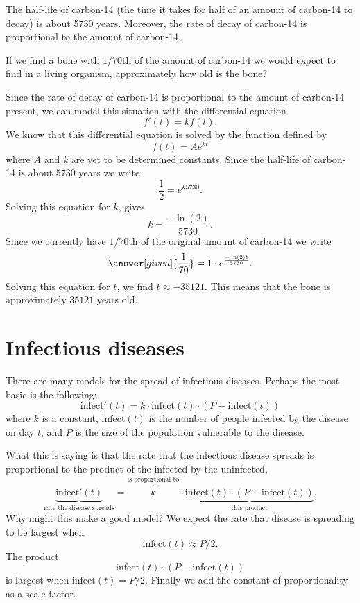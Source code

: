 \documentclass{ximera}
\begin{document}
\begin{example}
The half-life of carbon-14 (the time it takes for half of an amount of
carbon-14 to decay) is about 5730 years. Moreover, the rate of decay
of carbon-14 is proportional to the amount of carbon-14.

If we find a bone with $1/70$th of the amount of carbon-14 we would
expect to find in a living organism, approximately how old is the
bone?

\begin{explanation}
Since the rate of decay of carbon-14 is proportional to the amount of
carbon-14 present, we can model this situation with the differential
equation
\[
f'(t) = k f(t).
\]
We know that this differential equation is solved by the function
defined by
\[
f(t) = A e^{kt}
\]
where $A$ and $k$ are yet to be determined constants. Since the
half-life of carbon-14 is about $5730$ years we write
\[
\frac{1}{2} = e^{k 5730}.
\]
Solving this equation for $k$, gives
\[
k = \frac{-\ln(2)}{5730}.
\]
Since we currently have $1/70$th of the original amount of carbon-14
we write
\[
\answer[given]{\frac{1}{70}} = 1\cdot e^{\frac{-\ln(2)t}{5730}}.
\]
Solving this equation for $t$, we find $t \approx -35121$. This means
that the bone is approximately $35121$ years old.
\end{explanation}
\end{example}




\section{Infectious diseases}

There are many models for the spread of infectious diseases. Perhaps
the most basic is the following:
\[
\mathrm{infect}'(t) = k\cdot \mathrm{infect}(t)\cdot(P-\mathrm{infect}(t))
\]
where $k$ is a constant, $\mathrm{infect}(t)$ is the number of people
infected by the disease on day $t$, and $P$ is the size of the
population vulnerable to the disease.

What this is saying is that the rate that the infectious disease
spreads is proportional to the product of the infected by the
uninfected,
\[
\underbrace{\mathrm{infect}'(t)}_{\text{rate the disease
spreads}} = \overbrace{k}^{\text{is proportional to}} \cdot \underbrace{\mathrm{infect}(t)\cdot(P-\mathrm{infect}(t))}_{\text{this product}}.
\]
Why might this make a good model? We expect the rate that
disease is spreading to be largest when
\[
\mathrm{infect}(t) \approx P/2.
\]
The product
\[
\mathrm{infect}(t)\cdot (P-\mathrm{infect}(t))
\]
is largest when $\mathrm{infect}(t) = P/2$. Finally we add the constant
of proportionality as a scale factor.
\end{document}
